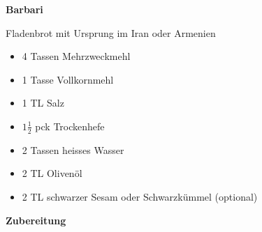 


\parindent0pt	

\pagestyle{empty}


\textbf{{\LARGE Barbari}}%

\hrulefill \newline
Fladenbrot mit Ursprung im Iran oder Armenien
\vspace*{\fill}


\begin{multicols}{2}	


\begin{itemize}
\item  4 Tassen Mehrzweckmehl
\item  1 Tasse Vollkornmehl
\item  1 TL Salz
\item $1\frac{1}{2}$ pck Trockenhefe 
\item  2 Tassen heisses Wasser
\item  2 TL Olivenöl
\item 2 TL schwarzer Sesam oder Schwarzkümmel (optional)
\end{itemize}
\vfill									
\end{multicols}

\vspace{2cm}			%
\begin{center}			%

\end{center}


\vfill
\newpage
\textbf{{\LARGE Zubereitung}}%

\hrulefill

